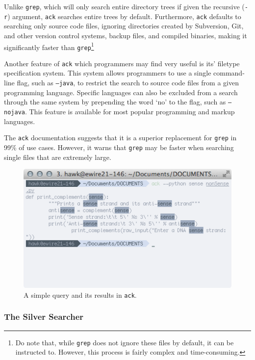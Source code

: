 \documentclass[12pt,letterpaper]{article}
\begin{document}
				Unlike \texttt{grep}, which will only search entire directory trees if given the recursive (\texttt{-r}) argument, \texttt{ack} searches entire trees by default. Furthermore, \texttt{ack} defaults to searching only source code files, ignoring directories created by Subversion, Git, and other version control systems, backup files, and compiled binaries, making it significantly faster than \texttt{grep}\footnote{Do note that, while \texttt{grep} does not ignore these files by default, it can be instructed to. However, this process is fairly complex and time-consuming.} 

				Another feature of \texttt{ack} which programmers may find very useful is its' filetype specification system. This system allows programmers to use a single command-line flag, such as \texttt{--java}, to restrict the search to source code files from a given programming language. Specific languages can also be excluded from a search through the same system by prepending the word `no' to the flag, such as \texttt{--nojava}. This feature is available for most popular programming and markup languages.

				The \texttt{ack} documentation suggests that it is a superior replacement for \texttt{grep} in 99\% of use cases. However, it warns that \texttt{grep} may be faster when searching single files that are extremely large.

				\begin{figure}[H]
					\centering
					\includegraphics[resolution=72, scale = 0.75]{Figures/ack.png}
					\caption{A simple query and its results in \texttt{ack}.}
					\label{fig:ag}
				\end{figure}


			\subsubsection{The Silver Searcher}
\end{document}

